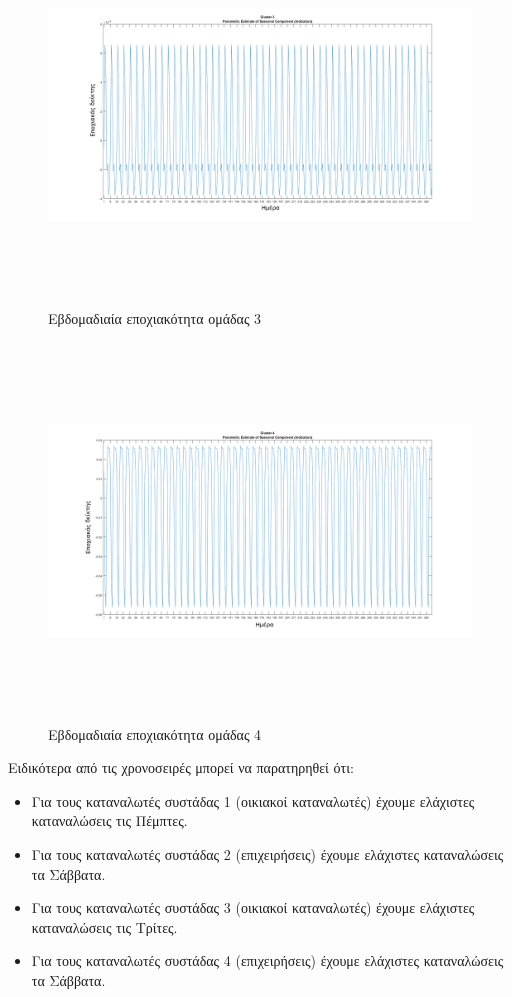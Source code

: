 \begin{figure}[ht!]
\centering
\includegraphics[width=180mm, height=100mm]{../../plots/Trend_estimation/seasonal_3.png}
\caption{Εβδομαδιαία εποχιακότητα ομάδας 3}
\label{fig:season 3}
\end{figure}
\begin{figure}[ht!]
\centering
\includegraphics[width=180mm, height=100mm]{../../plots/Trend_estimation/seasonal_4.png}
\caption{Εβδομαδιαία εποχιακότητα ομάδας 4}
\label{fig:season 4}
\end{figure}
\newpage
Ειδικότερα από τις χρονοσειρές μπορεί να παρατηρηθεί ότι:
\begin{itemize}
\item Για τους καταναλωτές συστάδας 1 (οικιακοί καταναλωτές) έχουμε ελάχιστες καταναλώσεις τις Πέμπτες.
\item Για τους καταναλωτές συστάδας 2 (επιχειρήσεις) έχουμε ελάχιστες καταναλώσεις τα Σάββατα.
\item Για τους καταναλωτές συστάδας 3 (οικιακοί καταναλωτές) έχουμε ελάχιστες καταναλώσεις τις Τρίτες.
\item Για τους καταναλωτές συστάδας 4 (επιχειρήσεις) έχουμε ελάχιστες καταναλώσεις τα Σάββατα.
\end{itemize}
